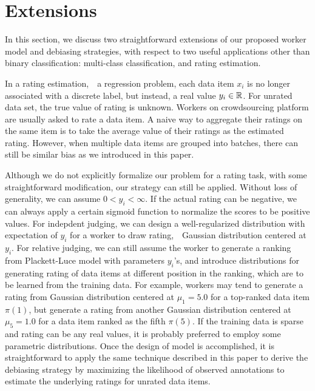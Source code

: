 \section{Extensions}
\label{sec:ext}

In this section, we discuss two straightforward extensions of our proposed worker model and debiasing strategies, 
with respect to two useful applications other than binary classification: 
multi-class classification, and rating estimation.  

In a rating estimation,~\ie~a regression problem, 
each data item $x_i$ is no longer associated with a discrete label, 
but instead, a real value $y_i \in {\mathbb{R}}$.  
For unrated data set, the true value of rating is unknown.  
Workers on crowdsourcing platform are usually asked to rate a data item.  
A naive way to aggregate their ratings on the same item 
is to take the average value of their ratings as the estimated rating.  
However, when multiple data items are grouped into batches, 
there can still be similar bias as we introduced in this paper.  

Although we do not explicitly formalize our problem for a rating task, 
with some straightforward modification, 
our strategy can still be applied.  
Without loss of generality, we can assume $0 < y_i < \infty$.  
If the actual rating can be negative, 
we can always apply a certain sigmoid function to normalize the scores to be positive values.  
For indepdent judging, we can design a well-regularized distribution with expectation of $y_i$ 
for a worker to draw rating,~\eg~Gaussian distribution centered at $y_i$.  
For relative judging, we can still assume the worker to generate a ranking from Plackett-Luce model with parameters $y_i$'s, 
and introduce distributions for generating rating of data items at different position in the ranking, 
which are to be learned from the training data.  
For example, workers may tend to generate a rating from Gaussian distribution centered at $\mu_1=5.0$ for a top-ranked data item $\pi(1)$, 
but generate a rating from another Gaussian distribution centered at $\mu_5=1.0$ for a data item ranked as the fifth $\pi(5)$.  
If the training data is sparse and rating can be any real values, 
it is probably preferred to employ some parametric distributions.    
Once the design of model is accomplished, 
it is straightforward to apply the same technique described in this paper 
to derive the debiasing strategy by maximizing the likelihood of observed annotations 
to estimate the underlying ratings for unrated data items.  


